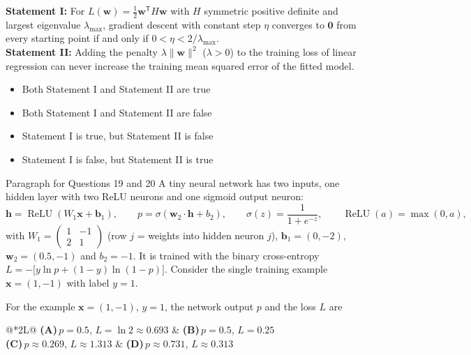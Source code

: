 \documentclass[11pt,a4paper]{article}
\newcommand{\optlabel}[1]{\textbf{(#1)}}
\newenvironment{qitem}[1]{\begin{list}{}{\setlength{\leftmargin}{3.3em}\setlength{\labelwidth}{3.1em}%
  \setlength{\labelsep}{0.2em}\setlength{\topsep}{3pt}\setlength{\parsep}{3pt}}\item[\textbf{Q.#1}\hfill]}{\end{list}}
\newcommand{\qsep}{\par\vspace{2pt}{\color{black!15}\hrule}\vspace{4pt}}
\begin{document}
\begin{qitem}{18}
\textbf{Statement I:} For $L(\mathbf w) = \frac12\mathbf w^{\mathsf T}H\mathbf w$ with $H$ symmetric positive definite and
largest eigenvalue $\lambda_{\max}$, gradient descent with constant step $\eta$ converges to $\mathbf 0$ from every starting
point if and only if $0 < \eta < 2/\lambda_{\max}$.\\[1mm]
\textbf{Statement II:} Adding the penalty $\lambda\|\mathbf w\|^2$ ($\lambda > 0$) to the training loss of linear regression
can never increase the training mean squared error of the fitted model.
\begin{itemize}[leftmargin=2.6em, labelsep=0.4em, itemsep=2pt, topsep=3pt]
\item[\optlabel{A}] Both Statement I and Statement II are true
\item[\optlabel{B}] Both Statement I and Statement II are false
\item[\optlabel{C}] Statement I is true, but Statement II is false
\item[\optlabel{D}] Statement I is false, but Statement II is true
\end{itemize}
\end{qitem}
\qsep

\begin{passagebox}{Paragraph for Questions 19 and 20}
A tiny neural network has two inputs, one hidden layer with two ReLU neurons and one sigmoid output neuron:
\[ \mathbf h = \operatorname{ReLU}(W_1\mathbf x + \mathbf b_1),\qquad p = \sigma(\mathbf w_2\cdot\mathbf h + b_2),\qquad
   \sigma(z) = \frac{1}{1 + e^{-z}},\qquad \operatorname{ReLU}(a) = \max(0, a), \]
with $W_1 = \begin{pmatrix}1 & -1\\ 2 & 1\end{pmatrix}$ (row $j$ = weights into hidden neuron $j$), $\mathbf b_1 = (0, -2)$,
$\mathbf w_2 = (0.5, -1)$ and $b_2 = -1$. It is trained with the binary cross-entropy
$L = -\big[y\ln p + (1-y)\ln(1-p)\big]$. Consider the single training example $\mathbf x = (1, -1)$ with label $y = 1$.
\end{passagebox}
\begin{qitem}{19}
For the example $\mathbf x = (1, -1)$, $y = 1$, the network output $p$ and the loss $L$ are
\par\smallskip\noindent\begin{tabularx}{\linewidth}{@{}*{2}{L}@{}}
\optlabel{A}\,$p = 0.5$, $L = \ln 2 \approx 0.693$ & \optlabel{B}\,$p = 0.5$, $L = 0.25$ \\[3pt]
\optlabel{C}\,$p \approx 0.269$, $L \approx 1.313$ & \optlabel{D}\,$p \approx 0.731$, $L \approx 0.313$
\end{tabularx}
\end{qitem}
\qsep
\end{document}
